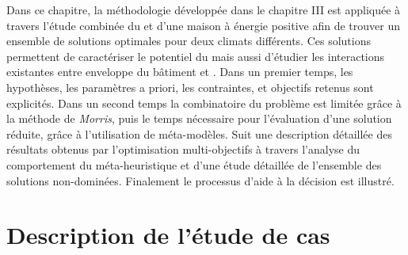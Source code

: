 



Dans ce chapitre, la méthodologie développée dans le chapitre III est appliquée
à travers l’étude combinée du  et d’une maison à énergie positive afin de trouver
un ensemble de solutions optimales pour deux climats différents. Ces solutions permettent de caractériser le potentiel
du  mais aussi d’étudier les interactions existantes entre enveloppe du bâtiment et .
Dans un premier temps, les hypothèses, les paramètres a priori,
les contraintes, et objectifs retenus sont explicités. Dans un second temps la combinatoire
du problème est limitée grâce à la méthode de \textit{Morris}, puis le temps nécessaire
pour l’évaluation d’une solution réduite, grâce à l’utilisation de méta-modèles.
Suit une description détaillée des résultats obtenus par l’optimisation multi-objectifs
à travers l’analyse du comportement du méta-heuristique et d’une étude détaillée
de l’ensemble des solutions non-dominées. Finalement le processus d’aide à la décision est
illustré.
\clearpage


\section{Description de l’étude de cas} %
\label{sec:description_de_l_etude_de_cas}


